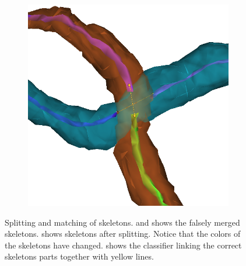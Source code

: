 \begin{figure}[htpb]
\begin{subfigure}[b]{0.24\textwidth}
		\caption{\label{fig:splitNMatchC}}
	\end{subfigure}
	\hfill
	\begin{subfigure}[b]{0.24\textwidth}
		\centering
		\includegraphics[width=\textwidth]{data/images/splitNMatch/matched.png}
		\caption{\label{fig:splitNMatchD}}
	\end{subfigure}
	\caption{Splitting and matching of skeletons.  and  shows the falsely merged skeletons.  shows skeletons after splitting. Notice that the colors of the skeletons have changed.  shows the classifier linking the correct skeletons parts together with yellow lines.}
	\label{skelSplitNMatch}
\end{figure}
